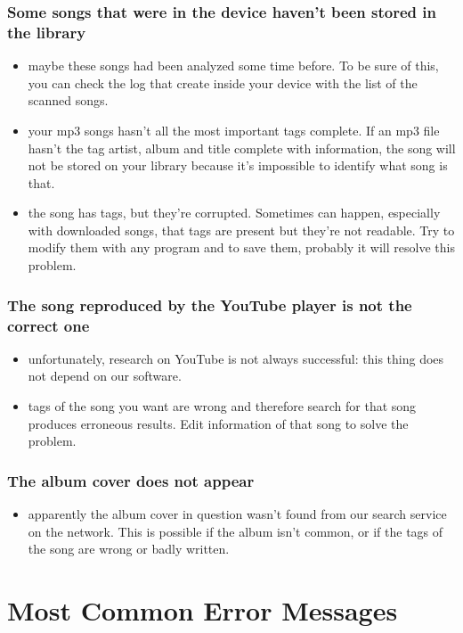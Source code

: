 \subsection*{Some songs that were in the device haven't been stored in the
library}
\begin{itemize}
  \item maybe these songs had been analyzed some time before. To be sure of
  this, you can check the log that  create inside your device with
  the list of the scanned songs.
  \item your mp3 songs hasn't all the most important tags complete. If an mp3
  file hasn't the tag artist, album and title complete with information, the
  song will not be stored on your library because it's impossible to identify
  what song is that.
  \item the song has tags, but they're corrupted. Sometimes can happen, especially
  with downloaded songs, that tags are present but they're not readable. Try to 
  modify them with any program and to save them, probably it will resolve this problem.
\end{itemize}

\subsection*{The song reproduced by the YouTube player is not the correct one}
\begin{itemize}
  \item unfortunately, research on YouTube is not always successful: this thing
   does not depend on our software.
  \item tags of the song you want are wrong and therefore
   search for that song produces erroneous results. Edit information
   of that song to solve the problem.
\end{itemize}

\subsection*{The album cover does not appear}
\begin{itemize}
  \item apparently the album cover in question wasn't
   found from our search service on the network. This is possible if
   the album isn't common, or if the tags of the
   song are wrong or badly written.
\end{itemize}

\appendix %
\chapter{Most Common Error Messages}
\thispagestyle{fancy}

